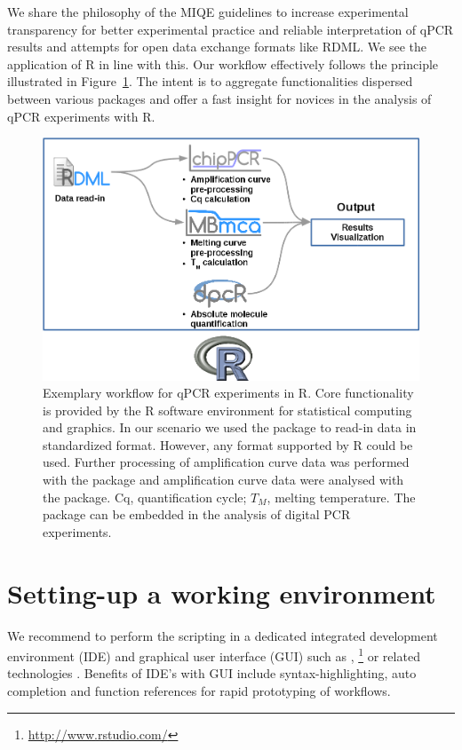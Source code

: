 We share the philosophy of the MIQE guidelines to increase experimental 
transparency for better experimental practice and reliable interpretation of 
qPCR results and attempts for open data exchange formats like RDML. We see the 
application of R in line with this. Our workflow effectively follows the 
principle illustrated in Figure~\ref{figure:workflow}. The intent is to 
aggregate functionalities dispersed between various packages and offer a fast 
insight for novices in the analysis of qPCR experiments with R.

\begin{figure}[htbp]
  \centering
  \includegraphics{figures/workflow.png}
  \caption{Exemplary workflow for qPCR experiments in R. Core functionality is 
provided by the R software environment for statistical computing and graphics. 
In our scenario we used the  package to read-in data in 
standardized format. However, any format supported by R could be used. Further 
processing of amplification curve data was performed with the  
package and amplification curve data were analysed with the  
package. Cq, quantification cycle; $T_{M}$, melting temperature. The 
 package can be embedded in the analysis 
of digital PCR experiments.
} \label{figure:workflow}
\end{figure}

\section{Setting-up a working environment}

We recommend to perform the scripting in a dedicated integrated development 
environment (IDE) and graphical user interface (GUI) such as  
\citep{rodiger_rkward_2012}, 
\footnote{\url{http://www.rstudio.com/}} or related technologies 
\citep{Valero_2012}. Benefits of IDE's with GUI include syntax-highlighting, 
auto completion and function references for rapid prototyping of workflows.

